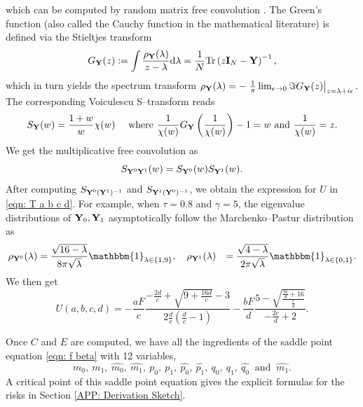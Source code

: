 \documentclass[9pt,twocolumn]{pnas-new}
\begin{document}
which can be computed by random matrix free convolution \cite{voiculescu1992free}. The Green's function (also called the Cauchy function in the mathematical literature) is defined via the Stieltjes transform
\begin{equation}\label{eqn: Stieltjes}
    G_{\mathbf{Y}}(z):=\int \frac{\rho_{\mathbf{Y}}(\lambda)}{z-\lambda} \mathrm{d} \lambda =\frac{1}{N} \mathrm{Tr} \left( z \mathbf{I}_N -\mathbf{Y} \right)^{-1},
\end{equation}
which in turn yields the spectrum transform
$
    \rho_{\mathbf{Y}}(\lambda)=-\left.\frac{1}{\pi} \lim _{\epsilon \rightarrow 0} \Im G_{\mathbf{Y}}(z)\right|_{z=\lambda+i \epsilon}.$
The corresponding Voiculescu S–transform reads
\begin{equation*}
    S_{\mathbf{Y}}(w)=\frac{1+w}{w} \chi(w) \quad \text{ where } \frac{1}{\chi(w)} G_{\mathbf{Y}}\left(\frac{1}{\chi(w)}\right)-1=w  \text{ and } \frac{1}{\chi(w)}=z.
\end{equation*}
We get the multiplicative free convolution as
\begin{equation}
    S_{\mathbf{Y}^0 \mathbf{Y}^1}(w)=S_{\mathbf{Y}^0}(w) S_{\mathbf{Y}^1}(w).
\end{equation}
After computing $S_{\mathbf{Y}^0(\mathbf{Y}^{1})^{-1}}$ and $S_{\mathbf{Y}^1(\mathbf{Y}^0)^{-1}}$, we obtain the expression for $U$ in \eqref{eqn: T a b c d}. For example, when $\tau=0.8$ and $\gamma=5$, the eigenvalue distributions of $\mathbf{Y}_0, \mathbf{Y}_1$ asymptotically follow the Marchenko--Pastur distribution as
\begin{equation*}
    \begin{aligned}
        \rho_{\mY^0}(\lambda)&=\frac{\sqrt{16-\lambda }}{8 \pi  \sqrt{\lambda }}\mathbbm{1}_{\lambda\in\{1,9\}},
        \quad \rho_{\mY^1}(\lambda)&=\frac{\sqrt{4-\lambda}}{2 \pi  \sqrt{\lambda}} \mathbbm{1}_{\lambda\in\{0,1\}}.
    \end{aligned}
\end{equation*}
We then get 
\begin{equation}
    U(a,b,c,d)=-\frac{aF}{c} \frac{-\frac{2d}{c}+\sqrt{9+\frac{16d}{c}}-3}{2 \frac{d}{c} (\frac{d}{c}-1)} -\frac{b F}{d} \frac{5-\sqrt{\frac{\frac{9c}{d}+16}{ \frac{c}{d}}}}{- \frac{2c}{d}+2}.
\end{equation}

Once $C$ and $E$ are computed, we have all the ingredients of the saddle point equation \eqref{eqn: f beta} with 12 variables, 
$$
    m_0,~m_1,~\widehat{m_0},~\widehat{m_1},~p_0,~p_1,~\widehat{p_0},~\widehat{p_1},~q_0,~q_1,~\widehat{q_0}~ \text{ and } ~\widehat{m_1}.
$$ 
A critical point of this saddle point equation gives the explicit formulas for the risks in Section \ref{APP: Derivation Sketch}.
\end{document}
